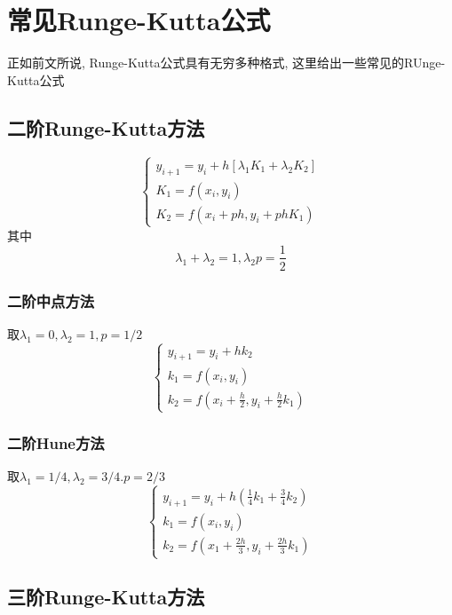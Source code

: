 \chapter{常见Runge-Kutta公式}

正如前文所说, Runge-Kutta公式具有无穷多种格式, 这里给出一些常见的RUnge-Kutta公式

\section{二阶Runge-Kutta方法}

\begin{equation*}
    \begin{cases}
        y_{i+1}=y_i+h[\lambda_1K_1+\lambda_2K_2]\\
        K_1=f(x_i,y_i)\\
        K_2=f(x_i+ph,y_i+phK_1)
    \end{cases}
\end{equation*}
其中
\begin{equation*}
    \lambda_1+\lambda_2=1, \lambda_2p=\frac{1}{2}
\end{equation*}

\subsection{二阶中点方法}
取$\lambda_1=0,\lambda_2=1,p=1/2$
\begin{equation*}
    \begin{cases}
        y_{i+1}=y_i+hk_2\\
        k_1=f(x_i,y_i)\\
        k_2=f(x_i+\frac{h}{2},y_i+\frac{h}{2}k_1)
    \end{cases}
\end{equation*}

\subsection{二阶Hune方法}
取$\lambda_1=1/4,\lambda_2=3/4.p=2/3$
\begin{equation*}
    \begin{cases}
        y_{i+1}=y_i+h\left(\frac{1}{4}k_1+\frac{3}{4}k_2\right)\\
        k_1=f(x_i,y_i)\\
        k_2=f(x_1+\frac{2h}{3},y_i+\frac{2h}{3}k_1)
    \end{cases}
\end{equation*}

\section{三阶Runge-Kutta方法}

